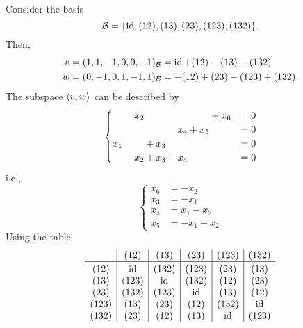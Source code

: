 \begin{xmpl}
                Consider the basis
                $$
                    \mathcal B=\{\operatorname{id},(12),(13),(23),(123),(132)\}.
                $$
                Then, %
                \begin{align*}
                    v=(1,1,-1,0,0,-1)_{\mathcal B} &= \operatorname{id}+(12)-(13)-(132)\\
                    w=(0,-1,0,1,-1,1)_{\mathcal B} &= -(12)+(23)-(123)+(132).
                \end{align*}
                The subspace $\langle v,w\rangle$ can be described by
                $$
                    \begin{cases}
                        \hphantom{x_1+{}}x_2\hphantom{{}+x_3+x_4+x_5}+x_6 &= 0\\
                        \hphantom{x_1+x_2+x_3+{}}x_4+x_5 &= 0\\
                        x_1\hphantom{{}+x_2}+x_3 &= 0\\
                        \hphantom{x_1+{}}x_2+x_3+x_4 &= 0
                    \end{cases}
                $$
                i.e.,
                $$
                    \begin{cases}
                        x_6 &= -x_2\\
                        x_3 &= -x_1\\
                        x_4 &= x_1-x_2\\
                        x_5 &= -x_1+x_2
                    \end{cases}
                $$
                Using the table
                \small
                $$
                    \begin{array}{c|c|c|c|c|c}
                              & (12) & (13) & (23) & (123) & (132)\\ \hline
                        \vphantom{{}^{|^|}}
                        (12)  & \id  & (132)& (123) & (23)  & (13)  \\
                        (13)  & (123)& \id  & (132) & (12)  & (23)  \\
                        (23)  & (132)& (123)& \id   & (13)  & (12)  \\
                        (123) & (13) & (23) & (12)  & (132) & \id   \\
                        (132) & (23) & (12) & (13)  & \id   & (123)
                    \end{array}
                $$
                \normalsize

\end{xmpl}
